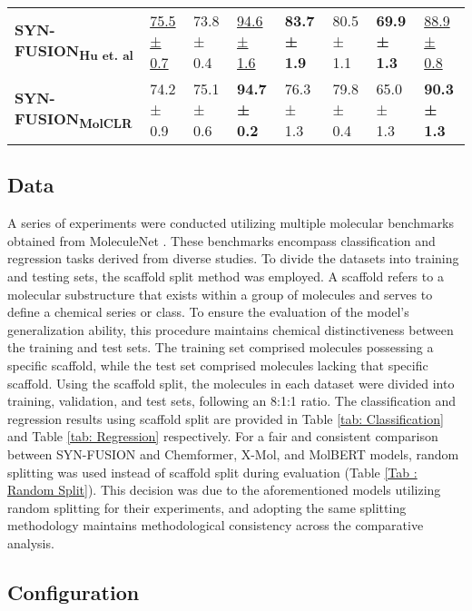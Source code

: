 \documentclass[sigconf,nonacm]{acmart}
\begin{document}
\begin{table*}[!t]
\begin{tabular}[width=0.8\linewidth]{llllllll}
        
         
         \hline

          \textbf{SYN-FUSION}\textsubscript{\textbf{Hu et. al}} & \underline{75.5 ± 0.7} & 73.8 ± 0.4 & \underline{94.6 ± 1.6}	& \textbf{83.7 ± 1.9} & 80.5 ± 1.1 & \textbf{69.9 ± 1.3} & \underline{88.9 ± 0.8} \\ 
           \textbf{SYN-FUSION}\textsubscript{\textbf{MolCLR}} & 74.2 ± 0.9 & 75.1 ± 0.6 & \textbf{94.7 ± 0.2}	& 76.3 ± 1.3 & 79.8 ± 0.4	& 65.0 ± 1.3 & \textbf{90.3 ± 1.3} \\
        \hline
\end{tabular}
    \label{tab: Classification}
\end{table*}

\subsection{Data}
A series of experiments were conducted utilizing multiple molecular benchmarks obtained from MoleculeNet \cite{C7SC02664A}. These benchmarks encompass classification and regression tasks derived from diverse studies. To divide the datasets into training and testing sets, the scaffold split method \cite{Bemis1996-qz} was employed. A scaffold refers to a molecular substructure that exists within a group of molecules and serves to define a chemical series or class. To ensure the evaluation of the model's generalization ability, this procedure maintains chemical distinctiveness between the training and test sets. The training set comprised molecules possessing a specific scaffold, while the test set comprised molecules lacking that specific scaffold.
Using the scaffold split, the molecules in each dataset were divided into training, validation, and test sets, following an 8:1:1 ratio. The classification and regression results using scaffold split are provided in Table \ref{tab: Classification} and Table \ref{tab: Regression} respectively.
For a fair and consistent comparison between SYN-FUSION and Chemformer, X-Mol, and MolBERT models, random splitting was used instead of scaffold split during evaluation (Table \ref{Tab : Random Split}). This decision was due to the aforementioned models utilizing random splitting for their experiments, and adopting the same splitting methodology maintains methodological consistency across the comparative analysis.



\subsection{Configuration}
\end{document}
